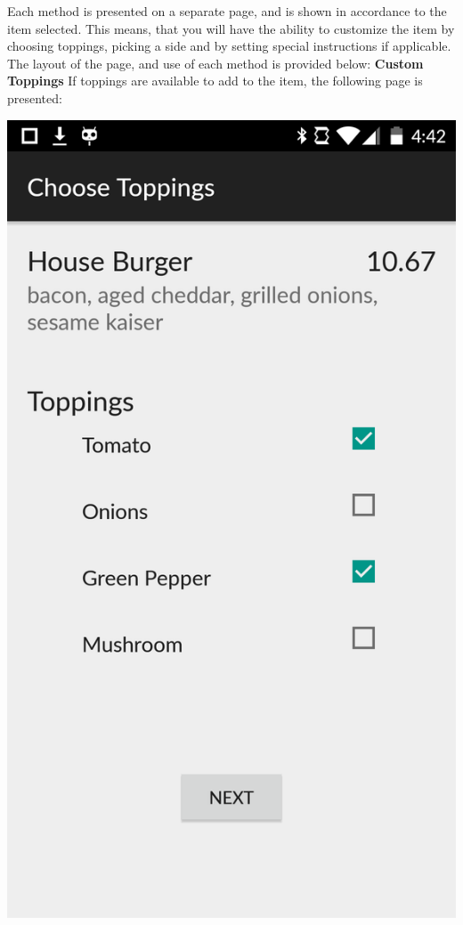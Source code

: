 \documentclass[12pt, titlepage]{article}
\begin{document}
\noindent  Each method is presented on a separate page, and is shown in accordance to the item selected. This means, that you will have the ability to customize the item by choosing toppings, picking a side and by setting special instructions if applicable. 
\newline \newline
The layout of the page, and use of each method is provided below: \pagebreak\newline
\textbf{Custom Toppings} \newline
If toppings are available to add to the item, the following page is presented:
\begin{center}\includegraphics[scale=0.15]{toppings.png}\end{center}
\end{document}
